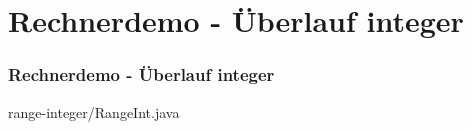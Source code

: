 \def\stitle{Rechnerdemo - Überlauf integer}
\section{\stitle}
\begin{frame}[fragile]%
  \frametitle{\stitle}%
\medskip


{range-integer/RangeInt.java}
\end{frame}
